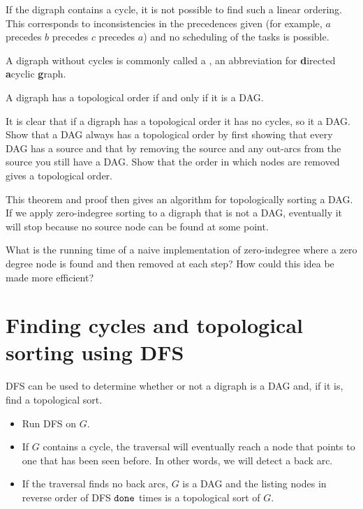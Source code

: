 If the digraph contains a cycle, it is not possible to find
such a linear ordering. This corresponds to inconsistencies in the
precedences given (for example, $a$ precedes $b$ precedes $c$ precedes $a$) and no scheduling of the tasks is possible.

\begin{Definition}
A digraph without cycles is commonly called a , an
abbreviation for \textbf{d}irected \textbf{a}cyclic \textbf{g}raph.  
\end{Definition}

\begin{Theorem} \label{thm:topDAG}
A digraph has a topological order if and only if it is a DAG.
\end{Theorem}

\begin{Boxample}[8]
It is clear that if a digraph has a topological order it has no cycles, so it a DAG. 
Show that a DAG always has a topological order by first showing that every DAG has a source
and that by removing the source and any out-arcs from the source you still have a DAG. 
Show that the order in which nodes are removed gives a topological order.
\end{Boxample}

This theorem and proof then gives an algorithm 
for topologically sorting a DAG. 
If we apply zero-indegree sorting to a digraph that is not a DAG, 
eventually it will stop because no source node can be found at some point.

\begin{Boxample}[3]
What is the running time of a naive implementation of zero-indegree where a zero degree node is found and then removed at each step? How could this idea be made more efficient?
\end{Boxample}

\section{Finding cycles and topological sorting using DFS}
DFS can be used to determine whether or not a digraph is a DAG and, if it is, find a topological sort.
\begin{itemize}
  \item Run DFS on $G$.
  \item If $G$ contains a cycle, the traversal will eventually reach a node that points to one that has been seen before. 
  In other words, we will detect a back arc. 
  \item If the traversal finds no back arcs, $G$ is a DAG 
  and the listing nodes in reverse order of DFS $\operatorname{\text{\texttt{done}}}$ times is a topological sort of $G$.
\end{itemize}

